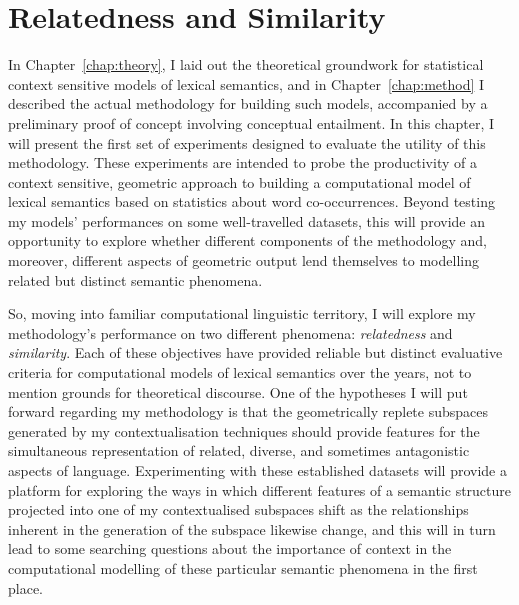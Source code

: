 \chapter{Relatedness and Similarity} \label{chap:relsim}
In Chapter~\ref{chap:theory}, I laid out the theoretical groundwork for statistical context sensitive models of lexical semantics, and in Chapter~\ref{chap:method} I described the actual methodology for building such models, accompanied by a preliminary proof of concept involving conceptual entailment.  In this chapter, I will present the first set of experiments designed to evaluate the utility of this methodology.  These experiments are intended to probe the productivity of a context sensitive, geometric approach to building a computational model of lexical semantics based on statistics about word co-occurrences.  Beyond testing my models' performances on some well-travelled datasets, this will provide an opportunity to explore whether different components of the methodology and, moreover, different aspects of geometric output lend themselves to modelling related but distinct semantic phenomena.

So, moving into familiar computational linguistic territory, I will explore my methodology's performance on two different phenomena: \emph{relatedness} and \emph{similarity}.  Each of these objectives have provided reliable but distinct evaluative criteria for computational models of lexical semantics over the years, not to mention grounds for theoretical discourse.  One of the hypotheses I will put forward regarding my methodology is that the geometrically replete subspaces generated by my contextualisation techniques should provide features for the simultaneous representation of related, diverse, and sometimes antagonistic aspects of language.  Experimenting with these established datasets will provide a platform for exploring the ways in which different features of a semantic structure projected into one of my contextualised subspaces shift as the relationships inherent in the generation of the subspace likewise change, and this will in turn lead to some searching questions about the importance of context in the computational modelling of these particular semantic phenomena in the first place.

